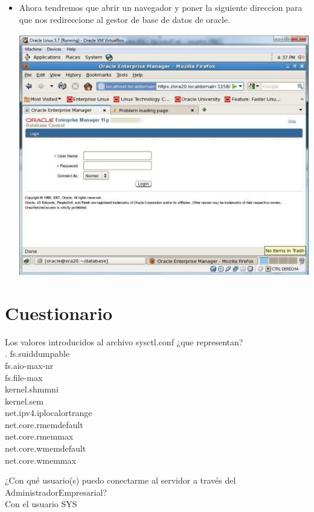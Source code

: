 \begin{itemize}
	\item Ahora tendremos que abrir un navegador y poner la siguiente direccion para que nos redireccione al gestor de base de datos de oracle.
	\begin{center}
	\includegraphics[width=13cm]{./Imagenes/img61} 
	\end{center}



\end{itemize} 
\newpage

\section{Cuestionario} 
	\item Los valores introducidos al archivo sysctl.conf ¿que representan?\\.
	fs.suiddumpable\\
    fs.aio-max-nr\\
    fs.file-max\\
    kernel.shmmni\\
    kernel.sem\\
    net.ipv4.iplocalortrange\\
    net.core.rmemdefault\\
    net.core.rmemmax\\
    net.core.wmemdefault\\
    net.core.wmemmax\\
   \item ¿Con qué usuario(s) puedo conectarme al servidor a través del AdministradorEmpresarial?\\
   Con el usuario SYS
